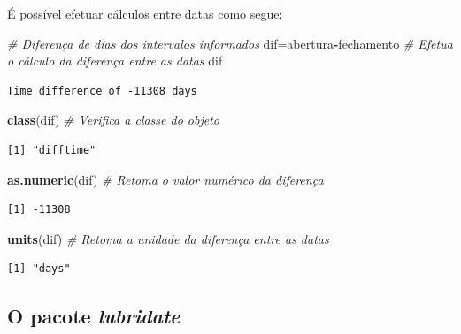 \documentclass[12pt,brazil,oneside]{book}
\newenvironment{Shaded}{\begin{snugshade}}{\end{snugshade}}
\newcommand{\CommentTok}[1]{\textcolor[rgb]{0.56,0.35,0.01}{\textit{#1}}}
\newcommand{\KeywordTok}[1]{\textcolor[rgb]{0.13,0.29,0.53}{\textbf{#1}}}
\newcommand{\NormalTok}[1]{#1}
\newcommand{\OperatorTok}[1]{\textcolor[rgb]{0.81,0.36,0.00}{\textbf{#1}}}
\begin{document}
É possível efetuar cálculos entre datas como segue:

\begin{Shaded}
\begin{Highlighting}[]
\CommentTok{# Diferença de dias dos intervalos informados}
\NormalTok{dif=abertura}\OperatorTok{-}\NormalTok{fechamento }\CommentTok{# Efetua o cálculo da diferença entre as datas}
\NormalTok{dif}
\end{Highlighting}
\end{Shaded}

\begin{verbatim}
Time difference of -11308 days
\end{verbatim}

\begin{Shaded}
\begin{Highlighting}[]
\KeywordTok{class}\NormalTok{(dif) }\CommentTok{# Verifica a classe do objeto}
\end{Highlighting}
\end{Shaded}

\begin{verbatim}
[1] "difftime"
\end{verbatim}

\begin{Shaded}
\begin{Highlighting}[]
\KeywordTok{as.numeric}\NormalTok{(dif) }\CommentTok{# Retoma o valor numérico da diferença}
\end{Highlighting}
\end{Shaded}

\begin{verbatim}
[1] -11308
\end{verbatim}

\begin{Shaded}
\begin{Highlighting}[]
\KeywordTok{units}\NormalTok{(dif) }\CommentTok{# Retoma a unidade da diferença entre as datas}
\end{Highlighting}
\end{Shaded}

\begin{verbatim}
[1] "days"
\end{verbatim}

\hypertarget{o-pacote-lubridate}{%
\subsection{\texorpdfstring{O pacote \emph{lubridate}}{O pacote lubridate}}\label{o-pacote-lubridate}}
\end{document}
